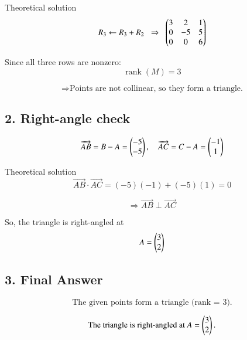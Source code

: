 \documentclass{beamer}
\begin{document}
\begin{frame}{Theoretical solution}
\begin{equation}
R_3 \leftarrow R_3+R_2
\;\;\Rightarrow\;\;
\begin{pmatrix}
3 & 2 & 1\\
0 & -5 & 5\\
0 & 0 & 6
\end{pmatrix}
\end{equation}

Since all three rows are nonzero:
\begin{equation}
\operatorname{rank}(M)=3
\end{equation}

\[
\Rightarrow \text{Points are not collinear, so they form a triangle.}
\]

\subsection*{2. Right-angle check}

\begin{equation}
\overrightarrow{AB}=B-A=\begin{pmatrix}-5\\-5\end{pmatrix}, \quad 
\overrightarrow{AC}=C-A=\begin{pmatrix}-1\\1\end{pmatrix}
\end{equation}
\end{frame}

\begin{frame}{Theoretical solution}
\begin{equation}
\overrightarrow{AB}\cdot \overrightarrow{AC} = (-5)(-1)+(-5)(1)=0
\end{equation}

\[
\Rightarrow \overrightarrow{AB}\perp \overrightarrow{AC}
\]

So, the triangle is right-angled at
\begin{equation}
A=\begin{pmatrix}3\\2\end{pmatrix}
\end{equation}

\subsection*{3. Final Answer}

\begin{equation}
\text{The given points form a triangle (rank = 3).}
\end{equation}

\begin{equation}
\text{The triangle is right-angled at } A=\begin{pmatrix}3\\2\end{pmatrix}.
\end{equation}

\end{frame}
\end{document}
